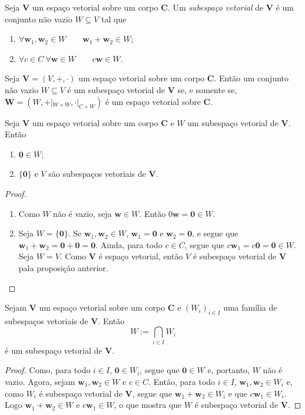 \begin{definition}
	Seja $\bm V$ um espaço vetorial sobre um corpo $\bm C$. Um \emph{subespaço vetorial} de $\bm V$ é um conjunto não vazio $W \subseteq V$ tal que
	\begin{enumerate}
	\item $\forall \bm w_1,\bm w_2 \in W \qquad \bm w_1 + \bm w_2 \in W$;
	\item $\forall c \in C \ \forall \bm w \in W \qquad c \bm w \in W$.
	\end{enumerate}
\end{definition}

\begin{proposition}
	Seja $\bm V=(V,+,\cdot)$ um espaço vetorial sobre um corpo $\bm C$. Então um conjunto não vazio $W \subseteq V$ é um subespaço vetorial de $\bm V$ se, e somente se, $\bm W=(W,+|_{W \times W},\cdot|_{C \times W})$ é um espaço vetorial sobre $\bm C$.
\end{proposition}

\begin{proposition}
	Seja $\bm V$ um espaço vetorial sobre um corpo $\bm C$ e $W$ um subespaço vetorial de $\bm V$. Então
	\begin{enumerate}
	\item $\bm 0 \in W$;
	\item $\{\bm 0\}$ e $V$ são subespaços vetoriais de $\bm V$.
	\end{enumerate}
\end{proposition}
\begin{proof}
	\begin{enumerate}
	\item Como $W$ não é vazio, seja $\bm w \in W$. Então $0 \bm w = \bm 0 \in W$.
	\item Seja $W=\{\bm 0\}$. Se $\bm w_1,\bm w_2 \in W$, $\bm w_1 = \bm 0$ e $\bm w_2 =\bm 0$, e segue que $\bm w_1 + \bm w_2 = \bm 0 + \bm 0 = \bm 0$. Ainda, para todo $c \in C$, segue que $c\bm w_1 = c\bm 0=\bm 0 \in W$.
	Seja $W=V$. Como $\bm V$ é espaço vetorial, então $V$ é subespaço vetorial de $\bm V$ pala proposição anterior. \qedhere
	\end{enumerate}
\end{proof}

\begin{proposition}
	Sejam $\bm V$ um espaço vetorial sobre um corpo $\bm C$ e $(W_i)_{i \in I}$ uma família de subespaços vetoriais de $\bm V$. Então
	\begin{equation*}
	W := \bigcap_{i \in I} W_i
	\end{equation*}
é um subespaço vetorial de $\bm V$.
\end{proposition}
\begin{proof}
	Como, para todo $i \in I$, $\bm 0 \in W_i$, segue que $\bm 0 \in W$ e, portanto, $W$ não é vazio. Agora, sejam $\bm w_1,\bm w_2 \in W$ e $c \in C$. Então, para todo $i \in I$, $\bm w_1,\bm w_2 \in W_i$ e, como $W_i$ é subespaço vetorial de $\bm V$, segue que $\bm w_1+\bm w_2 \in W_i$ e que $c\bm w_1 \in W_i$. Logo $\bm w_1+\bm w_2 \in W$ e $c\bm w_1 \in W$, o que mostra que $W$ é subespaço vetorial de $\bm V$.
\end{proof}

